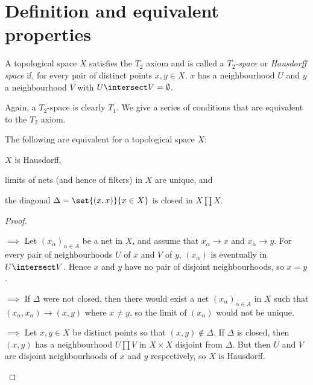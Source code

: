 \documentclass[article, a4paper, 11pt, oneside]{memoir}
\numberwithin{equation}{chapter}
\begin{document}
\section{Definition and equivalent properties}

\begin{definition}
    A topological space $X$ satisfies the $T_2$ axiom and is called a \emph{$T_2$-space} or \emph{Hausdorff space} if, for every pair of distinct points $x,y \in X$, $x$ has a neighbourhood $U$ and $y$ a neighbourhood $V$ with $U \intersect V = \emptyset$.
\end{definition}
%
Again, a $T_2$-space is clearly $T_1$. We give a series of conditions that are equivalent to the $T_2$ axiom.


\begin{proposition}
    \label{thm:Hausdorff-equivalent-properties}
    The following are equivalent for a topological space $X$:
    \begin{enumprop}
        \item \label{enum:T2-space} $X$ is Hausdorff,
        \item \label{enum:T2-limits_unique} limits of nets (and hence of filters) in $X$ are unique, and
        \item \label{enum:T2-closed_diagonal} the diagonal $\Delta = \set{(x,x)}{x \in X}$ is closed in $X \prod X$.
    \end{enumprop}
\end{proposition}

\begin{proof}
\begin{proofsec}
    \item[\subcref{enum:T2-space} $\implies$ \subcref{enum:T2-limits_unique}]
    Let $(x_\alpha)_{\alpha \in A}$ be a net in $X$, and assume that $x_\alpha \to x$ and $x_\alpha \to y$. For every pair of neighbourhoods $U$ of $x$ and $V$ of $y$, $(x_\alpha)$ is eventually in $U \intersect V$. Hence $x$ and $y$ have no pair of disjoint neighbourhoods, so $x = y$.

    \item[\subcref{enum:T2-limits_unique} $\implies$ \subcref{enum:T2-closed_diagonal}]
    If $\Delta$ were not closed, then there would exist a net $(x_\alpha)_{\alpha \in A}$ in $X$ such that $(x_\alpha, x_\alpha) \to (x,y)$ where $x \neq y$, so the limit of $(x_\alpha)$ would not be unique.

    \item[\subcref{enum:T2-closed_diagonal} $\implies$ \subcref{enum:T2-space}]
    Let $x,y \in X$ be distinct points so that $(x,y) \not\in \Delta$. If $\Delta$ is closed, then $(x,y)$ has a neighbourhood $U \prod V$ in $X \times X$ disjoint from $\Delta$. But then $U$ and $V$ are disjoint neighbourhoods of $x$ and $y$ respectively, so $X$ is Hausdorff.
\end{proofsec}
\end{proof}
\end{document}
